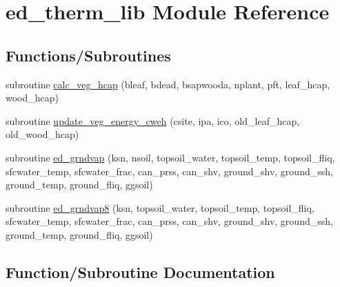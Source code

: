 \hypertarget{namespaceed__therm__lib}{}\section{ed\+\_\+therm\+\_\+lib Module Reference}
\label{namespaceed__therm__lib}
\subsection*{Functions/\+Subroutines}
\begin{DoxyCompactItemize}
\item 
subroutine \hyperlink{namespaceed__therm__lib_a882f2cd5f4a75f8c01d2167f45afebb7}{calc\+\_\+veg\+\_\+hcap} (bleaf, bdead, bsapwooda, nplant, pft, leaf\+\_\+hcap, wood\+\_\+hcap)
\item 
subroutine \hyperlink{namespaceed__therm__lib_ae2a805729a52bf5814d2c3a0d84f6fe8}{update\+\_\+veg\+\_\+energy\+\_\+cweh} (csite, ipa, ico, old\+\_\+leaf\+\_\+hcap, old\+\_\+wood\+\_\+hcap)
\item 
subroutine \hyperlink{namespaceed__therm__lib_aa6561183a4fc06ca1c9430914a5b6032}{ed\+\_\+grndvap} (ksn, nsoil, topsoil\+\_\+water, topsoil\+\_\+temp, topsoil\+\_\+fliq, sfcwater\+\_\+temp, sfcwater\+\_\+frac, can\+\_\+prss, can\+\_\+shv, ground\+\_\+shv, ground\+\_\+ssh, ground\+\_\+temp, ground\+\_\+fliq, ggsoil)
\item 
subroutine \hyperlink{namespaceed__therm__lib_a746a2bb61d932fd3cb928a3b5e5e832e}{ed\+\_\+grndvap8} (ksn, topsoil\+\_\+water, topsoil\+\_\+temp, topsoil\+\_\+fliq, sfcwater\+\_\+temp, sfcwater\+\_\+frac, can\+\_\+prss, can\+\_\+shv, ground\+\_\+shv, ground\+\_\+ssh, ground\+\_\+temp, ground\+\_\+fliq, ggsoil)
\end{DoxyCompactItemize}


\subsection{Function/\+Subroutine Documentation}
\mbox{\label{namespaceed__therm__lib_a882f2cd5f4a75f8c01d2167f45afebb7}} 
